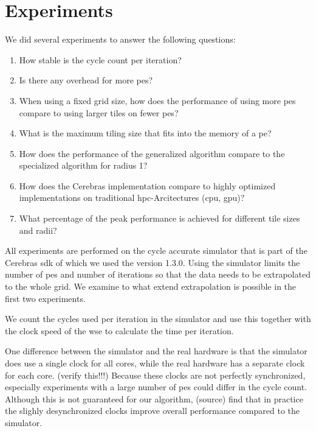 \chapter{Experiments}
\label{sec:experiments}
We did several experiments to answer the following questions:
\begin{enumerate}
    \item How stable is the cycle count per iteration?
    \item Is there any overhead for more \acp{pe}?
    \item When using a fixed grid size, how does the performance of using more \acp{pe} compare to using larger tiles on fewer \acp{pe}?
    \item What is the maximum tiling size that fits into the memory of a \ac{pe}?
    \item How does the performance of the generalized algorithm compare to the specialized algorithm for radius 1?
    \item How does the Cerebras implementation compare to highly optimized implementations on traditional \ac{hpc}-Arcitectures (\ac{cpu}, \ac{gpu})?
    \item What percentage of the peak performance is achieved for different tile sizes and radii?
\end{enumerate}

All experiments are performed on the cycle accurate simulator that is part of the Cerebras \ac{sdk} of which we used the version 1.3.0.
Using the simulator limits the number of \acp{pe} and number of iterations so that the data needs to be extrapolated to the whole grid.
We examine to what extend extrapolation is possible in the first two experiments.

We count the cycles used per iteration in the simulator and use this together with the clock speed of the \ac{wse} to calculate the time per iteration.

One difference between the simulator and the real hardware is that the simulator does use a single clock for all cores, while the real hardware has a separate clock for each core. (verify this!!!) Because these clocks are not perfectly synchronized, especially experiments with a large number of \acp{pe} could differ in the cycle count. Although this is not guaranteed for our algorithm, (source) find that in practice the slighly desynchronized clocks improve overall performance compared to the simulator. 

